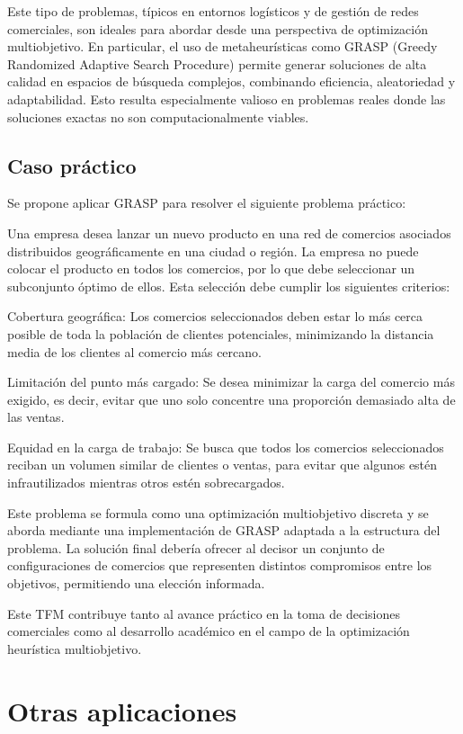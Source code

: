 \documentclass[12pt,a4paper]{book}
\begin{document}
Este tipo de problemas, típicos en entornos logísticos y de gestión de redes comerciales, son ideales para abordar desde una perspectiva de optimización multiobjetivo. En particular, el uso de metaheurísticas como GRASP (Greedy Randomized Adaptive Search Procedure) permite generar soluciones de alta calidad en espacios de búsqueda complejos, combinando eficiencia, aleatoriedad y adaptabilidad. Esto resulta especialmente valioso en problemas reales donde las soluciones exactas no son computacionalmente viables.

\subsection{Caso práctico}

Se propone aplicar GRASP para resolver el siguiente problema práctico:

Una empresa desea lanzar un nuevo producto en una red de comercios asociados distribuidos geográficamente en una ciudad o región. La empresa no puede colocar el producto en todos los comercios, por lo que debe seleccionar un subconjunto óptimo de ellos. Esta selección debe cumplir los siguientes criterios:

Cobertura geográfica: Los comercios seleccionados deben estar lo más cerca posible de toda la población de clientes potenciales, minimizando la distancia media de los clientes al comercio más cercano.

Limitación del punto más cargado: Se desea minimizar la carga del comercio más exigido, es decir, evitar que uno solo concentre una proporción demasiado alta de las ventas.

Equidad en la carga de trabajo: Se busca que todos los comercios seleccionados reciban un volumen similar de clientes o ventas, para evitar que algunos estén infrautilizados mientras otros estén sobrecargados.

Este problema se formula como una optimización multiobjetivo discreta y se aborda mediante una implementación de GRASP adaptada a la estructura del problema. La solución final debería ofrecer al decisor un conjunto de configuraciones de comercios que representen distintos compromisos entre los objetivos, permitiendo una elección informada.

Este TFM contribuye tanto al avance práctico en la toma de decisiones comerciales como al desarrollo académico en el campo de la optimización heurística multiobjetivo.


\section{Otras aplicaciones}
\end{document}
